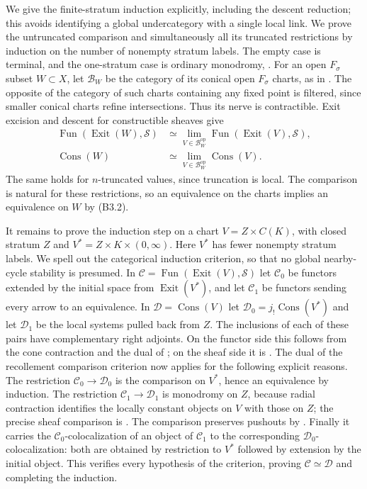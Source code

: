 We give the finite-stratum induction explicitly, including the descent
reduction; this avoids identifying a global undercategory with a single
local link. We prove the untruncated comparison and simultaneously all
its truncated restrictions by induction on the number of nonempty
stratum labels. The empty case is terminal, and the one-stratum case
is ordinary monodromy, \cite[Theorem A.4.19]{LurieHA}.
For an open $F_\sigma$ subset $W\subset X$, let $\mathcal B_W$ be the
category of its conical open $F_\sigma$ charts, as in
\cite[Lemma A.5.16]{LurieHA}. The opposite of the category of such charts
containing any fixed point is filtered, since smaller conical charts
refine intersections. Thus its nerve is contractible. Exit excision
\cite[Theorem A.7.1]{LurieHA} and descent for constructible sheaves give
\[
 \begin{split}
 \operatorname{Fun}(\operatorname{Exit}(W),\mathcal S)
 &\simeq\lim_{V\in\mathcal B_W^{\mathrm{op}}}
              \operatorname{Fun}(\operatorname{Exit}(V),\mathcal S),\\
 \operatorname{Cons}(W)
 &\simeq\lim_{V\in\mathcal B_W^{\mathrm{op}}}\operatorname{Cons}(V).
 \end{split}
 \tag{B3.2}
\]
The same holds for $n$-truncated values, since truncation is local.
The comparison is natural for these restrictions, so an equivalence
on the charts implies an equivalence on $W$ by (B3.2).

It remains to prove the induction step on a chart
$V=Z\times C(K)$, with closed stratum $Z$ and
$V^*=Z\times K\times(0,\infty)$. Here $V^*$ has fewer nonempty
stratum labels. We spell out the categorical induction criterion, so
that no global nearby-cycle stability is presumed.
In $\mathcal C=\operatorname{Fun}(\operatorname{Exit}(V),\mathcal S)$
let $\mathcal C_0$ be functors extended by the initial space from
$\operatorname{Exit}(V^*)$, and let $\mathcal C_1$ be functors sending
every arrow to an equivalence. In
$\mathcal D=\operatorname{Cons}(V)$ let $\mathcal D_0=j_!
\operatorname{Cons}(V^*)$ and let $\mathcal D_1$ be the local systems
pulled back from $Z$. The inclusions of each of these pairs have
complementary right adjoints. On the functor side this follows from
the cone contraction and the dual of \cite[Lemma A.9.18]{LurieHA};
on the sheaf side it is \cite[Lemma A.9.13]{LurieHA}.
The dual of the recollement comparison criterion
\cite[Proposition A.8.14]{LurieHA} now applies for the following
explicit reasons. The restriction
$\mathcal C_0\to\mathcal D_0$ is the comparison on $V^*$, hence an
equivalence by induction. The restriction
$\mathcal C_1\to\mathcal D_1$ is monodromy on $Z$, because radial
contraction identifies the locally constant objects on $V$ with
those on $Z$; the precise sheaf comparison is
\cite[Lemmas A.9.11--A.9.12]{LurieHA}. The comparison preserves
pushouts by \cite[Lemma A.9.15]{LurieHA}. Finally it carries the
$\mathcal C_0$-colocalization of an object of $\mathcal C_1$ to the
corresponding $\mathcal D_0$-colocalization: both are obtained by
restriction to $V^*$ followed by extension by the initial object.
This verifies every hypothesis of the criterion, proving
$\mathcal C\simeq\mathcal D$ and completing the induction.

